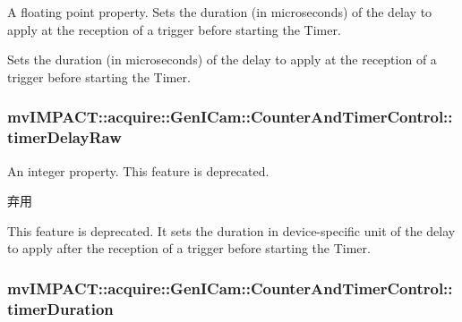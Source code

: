A floating point property. Sets the duration (in microseconds) of the delay to apply at the reception of a trigger before starting the Timer. 

Sets the duration (in microseconds) of the delay to apply at the reception of a trigger before starting the Timer. \hypertarget{classmv_i_m_p_a_c_t_1_1acquire_1_1_gen_i_cam_1_1_counter_and_timer_control_ae2a98a11b7a8ffd4379474d8d2118564}{
\subsubsection[{timer\+Delay\+Raw}]{ mv\+I\+M\+P\+A\+C\+T\+::acquire\+::\+Gen\+I\+Cam\+::\+Counter\+And\+Timer\+Control\+::timer\+Delay\+Raw}}\label{classmv_i_m_p_a_c_t_1_1acquire_1_1_gen_i_cam_1_1_counter_and_timer_control_ae2a98a11b7a8ffd4379474d8d2118564}


An integer property. This feature is deprecated. 

\begin{DoxyRefDesc}{弃用}
\item[\hyperlink{deprecated__deprecated000052}{弃用}]This feature is deprecated. It sets the duration in device-\/specific unit of the delay to apply after the reception of a trigger before starting the Timer. \end{DoxyRefDesc}
\hypertarget{classmv_i_m_p_a_c_t_1_1acquire_1_1_gen_i_cam_1_1_counter_and_timer_control_a1129d4390fb2db6fc43dea90a16ca32c}{
\subsubsection[{timer\+Duration}]{ mv\+I\+M\+P\+A\+C\+T\+::acquire\+::\+Gen\+I\+Cam\+::\+Counter\+And\+Timer\+Control\+::timer\+Duration}}\label{classmv_i_m_p_a_c_t_1_1acquire_1_1_gen_i_cam_1_1_counter_and_timer_control_a1129d4390fb2db6fc43dea90a16ca32c}


